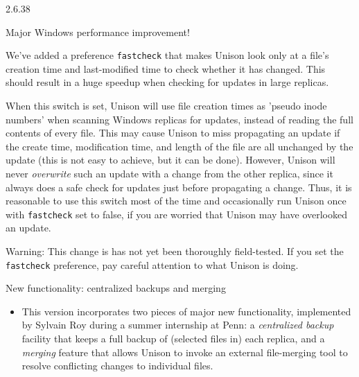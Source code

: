 \begin{changesfromversion}{2.6.38}
\item Major Windows performance improvement!

We've added a preference \verb|fastcheck| that makes Unison look only at
a file's creation time and last-modified time to check whether it has
changed.  This should result in a huge speedup when checking for updates
in large replicas.

  When this switch is set, Unison will use file creation times as
  'pseudo inode numbers' when scanning Windows replicas for updates,
  instead of reading the full contents of every file.  This may cause
  Unison to miss propagating an update if the create time,
  modification time, and length of the file are all unchanged by
  the update (this is not easy to achieve, but it can be done).
  However, Unison will never {\em overwrite} such an update with
  a change from the other replica, since it
  always does a safe check for updates just before propagating a
  change.  Thus, it is reasonable to use this switch most of the time
  and occasionally run Unison once with {\tt fastcheck} set to false,
  if you are worried that Unison may have overlooked an update.

  Warning: This change is has not yet been thoroughly field-tested.  If you
  set the \verb|fastcheck| preference, pay careful attention to what
  Unison is doing.

\item New functionality: centralized backups and merging
\begin{itemize}
\item This version incorporates two pieces of major new functionality,
   implemented by Sylvain Roy during a summer internship at Penn: a
   {\em centralized backup} facility that keeps a full backup of
   (selected files
   in) each replica, and a {\em merging} feature that allows Unison to
   invoke an external file-merging tool to resolve conflicting changes to
   individual files.


\end{itemize}
\end{changesfromversion}
